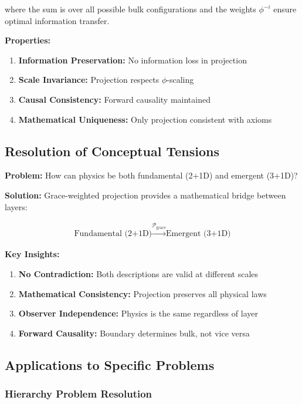\documentclass[11pt]{article}
\theoremstyle{definition}
\newcommand{\goldenratio}{\phi}
\begin{document}
where the sum is over all possible bulk configurations and the weights $\goldenratio^{-i}$ ensure optimal information transfer.

\textbf{Properties:}
\begin{enumerate}
\item \textbf{Information Preservation:} No information loss in projection
\item \textbf{Scale Invariance:} Projection respects $\goldenratio$-scaling
\item \textbf{Causal Consistency:} Forward causality maintained
\item \textbf{Mathematical Uniqueness:} Only projection consistent with axioms
\end{enumerate}

\subsection{Resolution of Conceptual Tensions}

\textbf{Problem:} How can physics be both fundamental (2+1D) and emergent (3+1D)?

\textbf{Solution:} Grace-weighted projection provides a mathematical bridge between layers:

\begin{align}
\text{Fundamental (2+1D)} \xrightarrow{\mathcal{P}_{\text{grace}}} \text{Emergent (3+1D)}
\end{align}

\textbf{Key Insights:}
\begin{enumerate}
\item \textbf{No Contradiction:} Both descriptions are valid at different scales
\item \textbf{Mathematical Consistency:} Projection preserves all physical laws
\item \textbf{Observer Independence:} Physics is the same regardless of layer
\item \textbf{Forward Causality:} Boundary determines bulk, not vice versa
\end{enumerate}

\subsection{Applications to Specific Problems}

\subsubsection{Hierarchy Problem Resolution}
\end{document}

